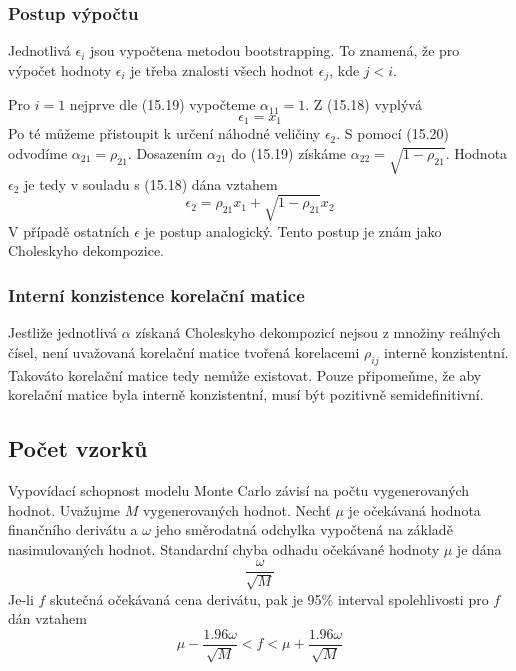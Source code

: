 \documentclass[a4paper]{book}
\begin{document}
\subsubsection{Postup výpočtu}

Jednotlivá $\epsilon_i$ jsou vypočtena metodou bootstrapping. To znamená, že pro výpočet hodnoty $\epsilon_i$ je třeba znalosti všech hodnot $\epsilon_j$, kde $j < i$.

Pro $i=1$ nejprve dle (15.19) vypočteme $\alpha_{11}=1$. Z (15.18) vyplývá
\begin{equation*}
\epsilon_1 = x_1
\end{equation*}
Po té můžeme přistoupit k určení náhodné veličiny $\epsilon_2$. S pomocí (15.20) odvodíme $\alpha_{21}=\rho_{21}$. Dosazením $\alpha_{21}$ do (15.19) získáme $\alpha_{22}=\sqrt{1-\rho_{21}}$. Hodnota  $\epsilon_2$ je tedy v souladu s (15.18) dána vztahem
\begin{equation*}
\epsilon_2 = \rho_{21}x_1 + \sqrt{1-\rho_{21}}x_2
\end{equation*}
V případě ostatních $\epsilon$ je postup analogický. Tento postup je znám jako Choleskyho dekompozice.

\subsubsection{Interní konzistence korelační matice}

Jestliže jednotlivá $\alpha$ získaná Choleskyho dekompozicí nejsou z množiny reálných čísel, není uvažovaná korelační matice tvořená korelacemi $\rho_{ij}$ interně konzistentní. Takováto korelační matice tedy nemůže existovat. Pouze připomeňme, že aby korelační matice byla interně konzistentní, musí být pozitivně semidefinitivní.

\subsection{Počet vzorků}

Vypovídací schopnost modelu Monte Carlo závisí na počtu vygenerovaných hodnot. Uvažujme $M$ vygenerovaných hodnot. Nechť $\mu$ je očekávaná hodnota finančního derivátu a $\omega$ jeho směrodatná odchylka vypočtená na základě nasimulovaných hodnot. Standardní chyba odhadu očekávané hodnoty $\mu$ je dána
\begin{equation*}
\frac{\omega}{\sqrt{M}}
\end{equation*}
Je-li $f$ skutečná očekávaná cena derivátu, pak je 95\% interval spolehlivosti pro $f$ dán vztahem
\begin{equation*}
\mu - \frac{1.96 \omega}{\sqrt{M}}<f< \mu + \frac{1.96\omega}{\sqrt{M}}
\end{equation*}
\end{document}
